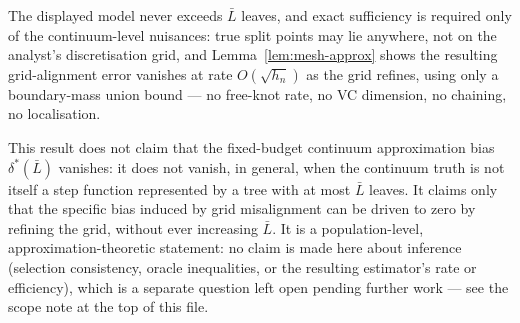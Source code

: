 \begin{remark}
The displayed model never exceeds $\bar L$ leaves, and exact sufficiency is
required only of the continuum-level nuisances: true split points may lie
anywhere, not on the analyst's discretisation grid, and Lemma~\ref{lem:mesh-approx}
shows the resulting grid-alignment error vanishes at rate $O(\sqrt{h_n})$ as the
grid refines, using only a boundary-mass union bound --- no free-knot rate,
no VC dimension, no chaining, no localisation.

This result does not claim that the fixed-budget continuum approximation bias
$\delta^*(\bar L)$ vanishes: it does not vanish, in general, when the continuum
truth is not itself a step function represented by a tree with at most
$\bar L$ leaves.  It claims only that the specific bias induced by grid
misalignment can be driven to zero by refining the grid, without ever
increasing $\bar L$.  It is a population-level, approximation-theoretic
statement: no claim is made here about inference (selection consistency,
oracle inequalities, or the resulting estimator's rate or efficiency), which
is a separate question left open pending further work --- see the scope note
at the top of this file.
\end{remark}






%
%
%
%
